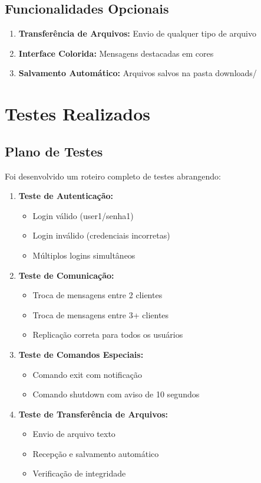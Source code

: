 \documentclass[12pt,a4paper]{article}
\begin{document}
\subsection{Funcionalidades Opcionais}

\begin{enumerate}
    \item \textbf{Transferência de Arquivos:} Envio de qualquer tipo de arquivo
    \item \textbf{Interface Colorida:} Mensagens destacadas em cores
    \item \textbf{Salvamento Automático:} Arquivos salvos na pasta downloads/
\end{enumerate}

\section{Testes Realizados}

\subsection{Plano de Testes}

Foi desenvolvido um roteiro completo de testes abrangendo:

\begin{enumerate}
    \item \textbf{Teste de Autenticação:}
    \begin{itemize}
        \item Login válido (user1/senha1)
        \item Login inválido (credenciais incorretas)
        \item Múltiplos logins simultâneos
    \end{itemize}
    
    \item \textbf{Teste de Comunicação:}
    \begin{itemize}
        \item Troca de mensagens entre 2 clientes
        \item Troca de mensagens entre 3+ clientes
        \item Replicação correta para todos os usuários
    \end{itemize}
    
    \item \textbf{Teste de Comandos Especiais:}
    \begin{itemize}
        \item Comando exit com notificação
        \item Comando shutdown com aviso de 10 segundos
    \end{itemize}
    
    \item \textbf{Teste de Transferência de Arquivos:}
    \begin{itemize}
        \item Envio de arquivo texto
        \item Recepção e salvamento automático
        \item Verificação de integridade
    \end{itemize}
\end{enumerate}
\end{document}
